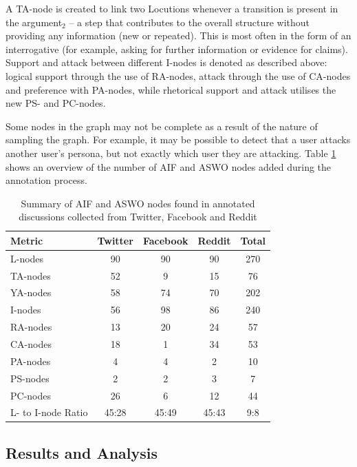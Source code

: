 A TA-node is created to link two Locutions whenever a transition is present in the argument$_2$ -- a step that contributes to the overall structure without providing any information (new or repeated). This is most often in the form of an interrogative (for example, asking for further information or evidence for claims). Support and attack between different I-nodes is denoted as described above: logical support through the use of RA-nodes, attack through the use of CA-nodes and preference with PA-nodes, while rhetorical support and attack utilises the new PS- and PC-nodes.

Some nodes in the graph may not be complete as a result of the nature of sampling the graph. For example, it may be possible to detect that a user attacks another user's persona, but not exactly which user they are attacking. Table \ref{table:aifnodes} shows an overview of the number of AIF and ASWO nodes added during the annotation process.

\begin{table}
\centering
\caption{Summary of AIF and ASWO nodes found in annotated discussions collected from Twitter, Facebook and Reddit}
\label{table:aifnodes}
\begin{tabular}{| l | c | c | c | c |}
\hline
\textbf{Metric} & \textbf{Twitter} & \textbf{Facebook} & \textbf{Reddit} & \textbf{Total}\\
\hline
L-nodes & 90 & 90 & 90 & 270\\
\hline
TA-nodes & 52 & 9 & 15 & 76\\
\hline
YA-nodes & 58 & 74 & 70 & 202\\
\hline
I-nodes & 56 & 98 & 86 & 240\\
\hline
RA-nodes & 13 & 20 & 24 & 57\\
\hline
CA-nodes & 18 & 1 & 34 & 53\\
\hline
PA-nodes & 4 & 4 & 2 & 10\\
\hline
PS-nodes & 2 & 2 & 3 & 7\\
\hline
PC-nodes & 26 & 6 & 12 & 44\\
\hline
L- to I-node Ratio & 45:28 & 45:49 & 45:43 & 9:8\\
\hline
\end{tabular}
\end{table}


\subsection{Results and Analysis}
\label{aswo:results}

